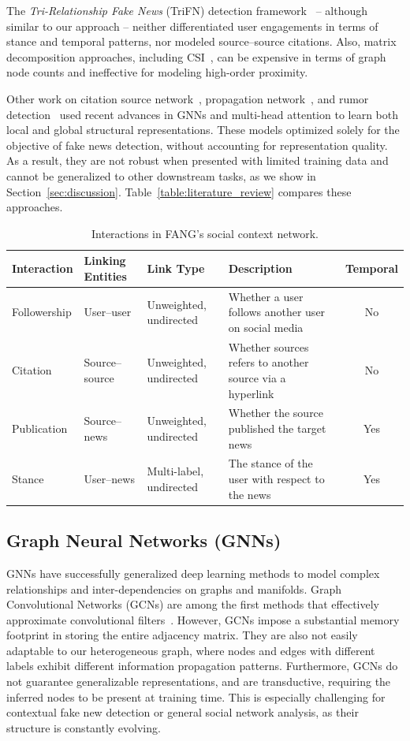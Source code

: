 \documentclass[sigconf]{acmart}
\theoremstyle{definition}
\theoremstyle{hypothesis}
\begin{document}
The \emph{Tri-Relationship Fake News} (TriFN) detection framework~\cite{shu2019beyond} -- although similar to our approach -- neither differentiated user engagements in terms of stance and temporal patterns, nor modeled source--source citations. Also, matrix decomposition approaches, including CSI~\cite{ruchansky2017csi}, can be expensive in terms of graph node counts and ineffective for modeling high-order proximity. 

Other work on citation source network~\cite{kulkarni2018multi}, propagation network~\cite{monti2019fake}, and rumor detection~\cite{yuan2019jointly,ming2019multiple} used recent advances in GNNs and multi-head attention to learn both local and global structural representations. 
These models optimized solely for the objective of fake news detection, without accounting for representation quality.
As a result, they are not robust 
when presented with limited training data and cannot be generalized to other downstream tasks, as we show in Section~\ref{sec:discussion}.
Table~\ref{table:literature_review} compares these approaches.

\begin{table}[tbh]
  \centering
  \small
  \caption{Interactions in FANG's social context network.}
  \begin{tabular}{llllc}
  \toprule
    \bf Interaction & \bf Linking Entities & \bf Link Type & \bf Description & \bf Temporal \\ 
    \midrule
    Followership & User--user & Unweighted, undirected & Whether a user follows another user on social media & No \\
    Citation & Source--source & Unweighted, undirected & Whether sources refers to another source via a hyperlink & No \\
    Publication & Source--news & Unweighted, undirected & Whether the source published the target news & Yes \\
    Stance & User--news & Multi-label, undirected & The stance of the user with respect to the news & Yes \\ 
    \bottomrule
  \end{tabular}
  \label{table:social_interactions}
\end{table}

\subsection{Graph Neural Networks (GNNs)}
GNNs have successfully generalized deep learning methods to model complex relationships and inter-dependencies on graphs and manifolds. Graph Convolutional Networks (GCNs) are among the first methods that effectively approximate convolutional filters~\cite{kipf2016semi}. However, GCNs impose a substantial memory footprint in storing the entire adjacency matrix.  They are also not easily adaptable to our heterogeneous graph, where nodes and edges with different labels exhibit different information propagation patterns. Furthermore, GCNs do not guarantee generalizable representations, and are transductive, requiring the inferred nodes to be present at training time. This is especially challenging for contextual fake new detection or general social network analysis, as their structure is constantly evolving.
\end{document}
